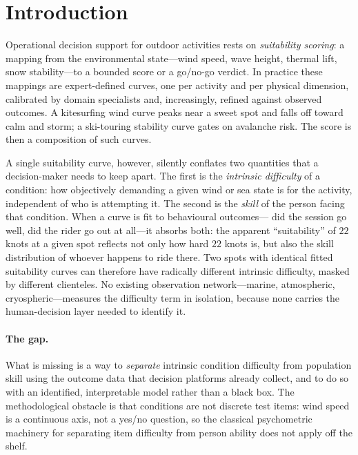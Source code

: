 \section{Introduction}
\label{sec:intro}

Operational decision support for outdoor activities rests on \emph{suitability
scoring}: a mapping from the environmental state---wind speed, wave height,
thermal lift, snow stability---to a bounded score or a go/no-go verdict. In
practice these mappings are expert-defined curves, one per activity and per
physical dimension, calibrated by domain specialists and, increasingly, refined
against observed outcomes. A kitesurfing wind curve peaks near a sweet spot and
falls off toward calm and storm; a ski-touring stability curve gates on
avalanche risk. The score is then a composition of such curves.

A single suitability curve, however, silently conflates two quantities that a
decision-maker needs to keep apart. The first is the \emph{intrinsic difficulty}
of a condition: how objectively demanding a given wind or sea state is for the
activity, independent of who is attempting it. The second is the \emph{skill} of
the person facing that condition. When a curve is fit to behavioural outcomes---
did the session go well, did the rider go out at all---it absorbs both: the
apparent ``suitability'' of $22$ knots at a given spot reflects not only how hard
$22$ knots is, but also the skill distribution of whoever happens to ride there.
Two spots with identical fitted suitability curves can therefore have radically
different intrinsic difficulty, masked by different clienteles. No existing
observation network---marine, atmospheric, cryospheric---measures the difficulty
term in isolation, because none carries the human-decision layer needed to
identify it.

\paragraph{The gap.} What is missing is a way to \emph{separate} intrinsic
condition difficulty from population skill using the outcome data that decision
platforms already collect, and to do so with an identified, interpretable model
rather than a black box. The methodological obstacle is that conditions are not
discrete test items: wind speed is a continuous axis, not a yes/no question, so
the classical psychometric machinery for separating item difficulty from person
ability does not apply off the shelf.

